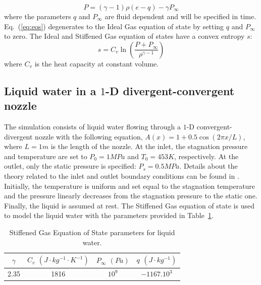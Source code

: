 \documentclass[preprint,10pt]{elsarticle}
\newcommand{\eqt}[1]{Eq.~(\ref{#1})}                     %
\newcommand{\tbl}[1]{Table~\ref{#1}}                     %
\begin{document}
\begin{equation}
\label{eq:eos}
P = (\gamma-1) \rho (e-q) - \gamma P_\infty
\end{equation}
where the parameters $q$ and $P_\infty$ are fluid dependent and will be specified in time. \eqt{eq:eos} degenerates to the Ideal Gas equation of state by setting $q$ and $P_\infty$ to zero. The Ideal and Stiffened Gas equation of states have a convex entropy $s$:
\begin{equation}
s = C_v \ln \left( \frac{P+P_\infty}{\rho^{\gamma-1}} \right) \nonumber
\end{equation}
where $C_v$ is the heat capacity at constant volume.
\subsection{Liquid water in a $1$-D divergent-convergent nozzle} \label{sec:liquid_nozzle}
The simulation consists of liquid water flowing through a $1$-D convergent-divergent nozzle with the following equation, $A(x) = 1 + 0.5 \cos(2 \pi x / L)$, where $L=1m$ is the length of the nozzle. At the inlet,  the stagnation pressure and temperature are set to $P_0 = 1 MPa$ and $T_0 = 453 K$, respectively. At the outlet, only the static pressure is specified: $P_s = 0.5MPa$. Details about the theory related to the inlet and outlet boundary conditions can be found in \cite{SEM}. Initially, the temperature is uniform and set equal to the stagnation temperature and the pressure linearly decreases from the stagnation pressure to the static one. Finally, the liquid is assumed at rest. The Stiffened Gas equation of state is used to model the liquid water with the parameters provided in \tbl{tbl:stff_gas_eos_liq}.
\begin{table}[H]
\begin{center}
 \caption{\label{tbl:stff_gas_eos_liq} Stiffened Gas Equation of State parameters for liquid water.}
 \begin{tabular}{|c|c|c|c|}
 \hline
$\gamma$ & $C_v$ $(J\cdot kg^{-1} \cdot K^{-1})$ & $P_\infty$ $(Pa)$ & $q$ $(J \cdot kg^{-1})$ \\
 \hline
2.35 & 1816 & $10^9$ & $-1167.10^3$   \\
  \hline
\end{tabular}
\end{center}
\end{table}
\end{document}
